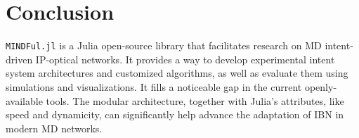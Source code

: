 \documentclass{juliacon}
\begin{document}
\section{Conclusion}
\verb|MINDFul.jl| is a Julia open-source library that facilitates research on \ac{MD} intent-driven IP-optical networks.
It provides a way to develop experimental intent system architectures and customized algorithms, as well as evaluate them using simulations and visualizations.
It fills a noticeable gap in the current openly-available tools.
The modular architecture, together with Julia's attributes, like speed and dynamicity, can significantly help advance the adaptation of \ac{IBN} in modern \ac{MD} networks.



\end{document}
